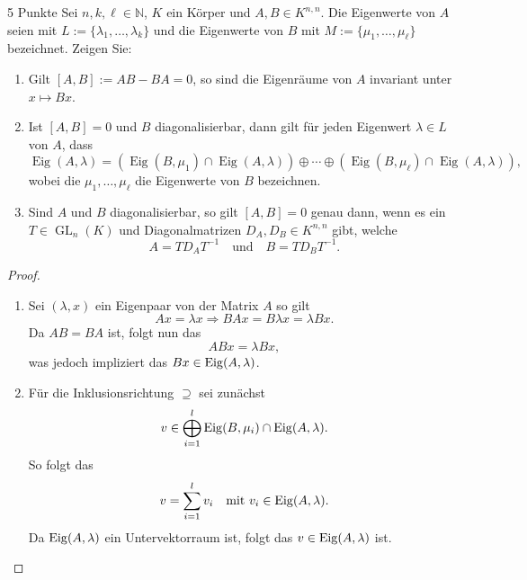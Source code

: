 \documentclass{problemset}
\author{Michael van Straten}
\begin{document}
\maketitle

\begin{problem}{5 Punkte}
Sei $n, k, \ell \in \mathbb{N}$, $K$ ein Körper und $A, B \in K^{n,n}$. Die
Eigenwerte von $A$ seien mit $L := \{\lambda_1, \ldots, \lambda_k\}$ und die
Eigenwerte von $B$ mit $M := \{\mu_1, \ldots, \mu_\ell\}$ bezeichnet. Zeigen
Sie:
\begin{enumerate}
    \item \label{eigenspace:invariant} Gilt $[A, B] := AB - BA = 0$, so sind die Eigenräume von $A$
          invariant unter $x \mapsto Bx$.
    \item \label{common-eigenvectors} Ist $[A, B] = 0$ und $B$ diagonalisierbar, dann gilt für jeden
          Eigenwert $\lambda \in L$ von $A$, dass
          \[
              \operatorname{Eig}(A, \lambda) = (\operatorname{Eig}(B, \mu_1) \cap \operatorname{Eig}(A, \lambda)) \oplus \cdots \oplus (\operatorname{Eig}(B, \mu_\ell) \cap \operatorname{Eig}(A, \lambda)),
          \]
          wobei die $\mu_1, \ldots, \mu_\ell$ die Eigenwerte von $B$
          bezeichnen.
    \item Sind $A$ und $B$ diagonalisierbar, so gilt $[A, B] = 0$ genau dann,
          wenn es ein $T \in \operatorname{GL}_n(K)$ und Diagonalmatrizen $D_A,
          D_B \in K^{n,n}$ gibt, welche
          \[
              A = T D_A T^{-1} \quad \text{und} \quad B = T D_B T^{-1}.
          \]
\end{enumerate}

\begin{proof}
    \leavevmode
    \begin{enumerate}
        \item Sei \((\lambda, x)\) ein Eigenpaar von der Matrix \(A\) so gilt
              \begin{equation*}
                  A x = \lambda x \Rightarrow B A x = B \lambda x = \lambda B x.
              \end{equation*}
              Da \(AB = BA\) ist, folgt nun das
              \begin{equation*}
                  A B x = \lambda B x,
              \end{equation*} was jedoch impliziert das \(Bx \in \operatorname{Eig}(A, \lambda)\).

        \item Für die Inklusionsrichtung \(\supseteq\) sei zunächst
              \begin{equation*}
                  v \in \mathop{\bigoplus}_{i=1}^l \operatorname{Eig}(B, \mu_i) \cap \operatorname{Eig}(A, \lambda).
              \end{equation*}
              So folgt das
              \begin{equation*}
                  v = \sum_{i = 1}^{l} v_i \quad \text{mit } v_i \in \operatorname{Eig}(A, \lambda).
              \end{equation*}
              Da \(\operatorname{Eig}(A, \lambda)\) ein Untervektorraum ist, folgt das \(v \in \operatorname{Eig}(A, \lambda)\) ist.


\end{enumerate}
\end{proof}
\end{problem}
\end{document}

